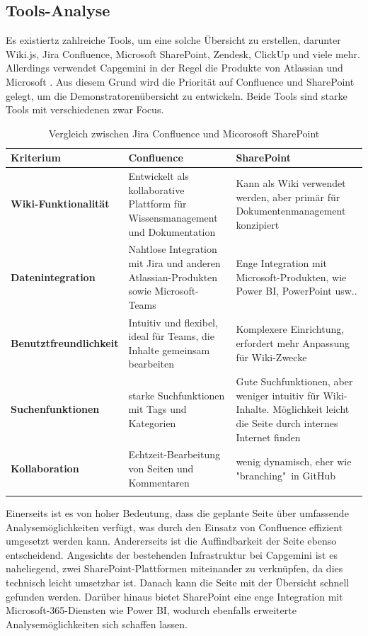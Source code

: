 \documentclass[a4paper, 12pt]{scrartcl}
\begin{document}
	\subsection{Tools-Analyse}%
Es existiertz zahlreiche Tools, um eine solche Übersicht zu erstellen, darunter Wiki.js, Jira Confluence, Microsoft SharePoint, Zendesk, ClickUp und viele mehr. Allerdings verwendet Capgemini in der Regel die Produkte von Atlassian und Microsoft . Aus diesem Grund wird die Priorität auf Confluence\cite{Confluence} und SharePoint\cite{SharePoint} gelegt, um die Demonstratorenübersicht zu entwickeln. Beide Tools sind starke Tools mit verschiedenen zwar Focus.
\newpage
	\begin{longtable}{|p{4.5cm}|p{5.5cm}|p{5.5cm}|}
		\hline
		\textbf{Kriterium} & \textbf{Confluence} & \textbf{SharePoint} \\ \hline
		\textbf{Wiki-Funktionalität} & Entwickelt als kollaborative Plattform für Wissensmanagement und Dokumentation & Kann als Wiki verwendet werden, aber primär für Dokumentenmanagement konzipiert \\ \hline
		\textbf{Datenintegration} & Nahtlose Integration mit Jira und anderen Atlassian-Produkten sowie Microsoft-Teams & Enge Integration mit Microsoft-Produkten, wie Power BI, PowerPoint usw..\\ \hline
		\textbf{Benutztfreundlichkeit} & Intuitiv und flexibel, ideal für Teams, die Inhalte gemeinsam bearbeiten & Komplexere Einrichtung, erfordert mehr Anpassung für Wiki-Zwecke\\ \hline
		\textbf{Suchenfunktionen} &starke Suchfunktionen mit Tags und Kategorien & Gute Suchfunktionen, aber weniger intuitiv für Wiki-Inhalte. Möglichkeit leicht die Seite durch internes Internet finden  \\ \hline
		\textbf{Kollaboration} &Echtzeit-Bearbeitung von Seiten und Kommentaren & wenig dynamisch, eher wie "branching"\ in GitHub \\ \hline
		\caption{Vergleich zwischen Jira Confluence und Micorosoft SharePoint}
	\end{longtable}
Einerseits ist es von hoher Bedeutung, dass die geplante Seite über umfassende Analysemöglichkeiten verfügt, was durch den Einsatz von Confluence effizient umgesetzt werden kann. Andererseits ist die Auffindbarkeit der Seite ebenso entscheidend. Angesichts der bestehenden Infrastruktur bei Capgemini ist es naheliegend, zwei SharePoint-Plattformen miteinander zu verknüpfen, da dies technisch leicht umsetzbar ist. Danach kann die Seite mit der Übersicht schnell gefunden werden. Darüber hinaus bietet SharePoint eine enge Integration mit Microsoft-365-Diensten wie Power BI, wodurch ebenfalls erweiterte Analysemöglichkeiten sich schaffen lassen.
\end{document}
